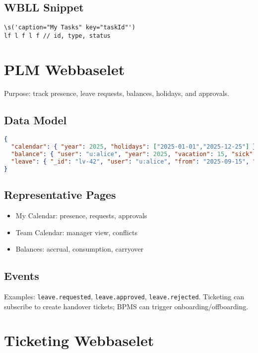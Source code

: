 \subsection{WBLL Snippet}
\begin{lstlisting}[language=WBLL,caption={My Tasks list (sketch)}]
\s('caption="My Tasks" key="taskId"')
lf l f l f // id, type, status
\end{lstlisting}

\section{PLM Webbaselet}
\label{sec:app-plm}

Purpose: track presence, leave requests, balances, holidays, and approvals.

\subsection{Data Model}
\begin{lstlisting}[language=JSON,caption={PLM entities}]
{
  "calendar": { "year": 2025, "holidays": ["2025-01-01","2025-12-25"] },
  "balance": { "user": "u:alice", "year": 2025, "vacation": 15, "sick": 5 },
  "leave": { "_id": "lv-42", "user": "u:alice", "from": "2025-09-15", "to": "2025-09-20", "type": "vacation", "status": "pending", "approver": "mgr:bob" }
}
\end{lstlisting}

\subsection{Representative Pages}
\begin{itemize}
  \item My Calendar: presence, requests, approvals
  \item Team Calendar: manager view, conflicts
  \item Balances: accrual, consumption, carryover
\end{itemize}

\subsection{Events}
Examples: \texttt{leave.requested}, \texttt{leave.approved}, \texttt{leave.rejected}. Ticketing can subscribe to create handover tickets; BPMS can trigger onboarding/offboarding.

\section{Ticketing Webbaselet}
\label{sec:app-ticketing}

